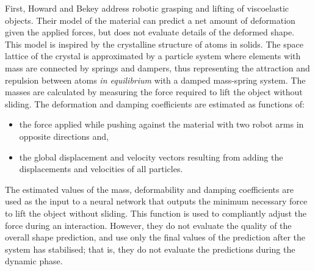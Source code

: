 \documentclass[journal]{IEEEtran}
\begin{document}
First, Howard and Bekey \cite{Howard2000} address robotic grasping and lifting of viscoelastic objects.  Their model of the material can predict a net amount of deformation given the applied forces, but does not evaluate details of the deformed shape.   This model is inspired by the crystalline structure of atoms in solids.  The space lattice of the crystal is approximated by a particle system where elements with mass are connected by springs and dampers, thus representing the attraction and repulsion between atoms \emph{in equilibrium} with a damped mass-spring system.  The masses are calculated by measuring the force required to lift the object without sliding.  The deformation and damping coefficients are estimated as functions of:
\begin{itemize}
 \item the force applied while pushing against the material with two robot arms in opposite directions and,
 \item the global displacement and velocity vectors resulting from adding the displacements and velocities of all particles.
\end{itemize}
The estimated values of the mass, deformability and damping coefficients are used as the input to a neural network that outputs the minimum necessary force to lift the object without sliding.  This function is used to compliantly adjust the force during an interaction.  However, they do not evaluate the quality of the overall shape prediction, and use only the final values of the prediction after the system has stabilised; that is, they do not evaluate the predictions during the dynamic phase.


\end{document}

